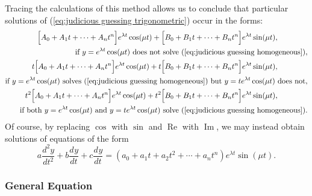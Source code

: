 \documentclass{myart}
\newcommand{\eq}[1]{(\ref{eq:#1})}
\newcommand{\deriv}[3][]{\frac{d^{#1}#2}{d#3^{#1}}}
\DeclareMathOperator{\OpRe}{Re}
\DeclareMathOperator{\OpIm}{Im}
\begin{document}
Tracing the calculations of this method allows us to conclude that
particular solutions of \eq{judicious guessing trigonometric} occur in
the forms:
\begin{align*}
       \Big[A_0 + A_1t + \cdots + A_nt^n\Big] e^{\lambda t} \cos(\mu t)
  +    \Big[B_0 + B_1t + \cdots + B_nt^n\Big] e^{\lambda t} \sin(\mu t),
    \qquad \qquad \\
  \text{if $y = e^{\lambda t} \cos(\mu t)$ does not
        solve \eq{judicious guessing homogeneous}}, \\
    t  \Big[A_0 + A_1t + \cdots + A_nt^n\Big] e^{\lambda t} \cos(\mu t)
  + t  \Big[B_0 + B_1t + \cdots + B_nt^n\Big] e^{\lambda t} \sin(\mu t),
    \qquad \qquad \\
  \text{if $y = e^{\lambda t} \cos(\mu t)$ solves
        \eq{judicious guessing homogeneous} but
        $y = te^{\lambda t} \cos(\mu t)$ does not}, \\
    t^2\Big[A_0 + A_1t + \cdots + A_nt^n\Big] e^{\lambda t} \cos(\mu t)
  + t^2\Big[B_0 + B_1t + \cdots + B_nt^n\Big] e^{\lambda t} \sin(\mu t),
    \qquad \qquad \\
  \text{if both $y = e^{\lambda t} \cos(\mu t)$ and
        $y = te^{\lambda t} \cos(\mu t)$ solve
        \eq{judicious guessing homogeneous}}.
\end{align*}
Of course, by replacing $\cos$ with $\sin$ and $\OpRe$ with $\OpIm$,
we may instead obtain solutions of equations of the form
\begin{equation*}
    a \deriv[2]{y}{t} + b \deriv{y}{t} + c \deriv{y}{t}
  = (a_0 + a_1t + a_2t^2 + \cdots + a_nt^n) e^{\lambda t} \sin(\mu t).
\end{equation*}

\subsubsection{General Equation}
\label{subsubsec:judicious guessing general}
\end{document}
